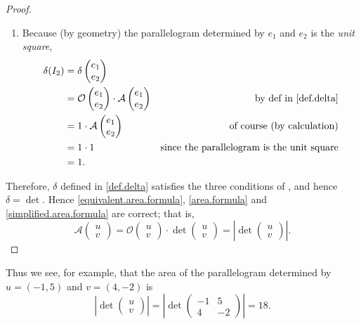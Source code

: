 \begin{proof}
\begin{enumerate}
\item
Because (by geometry) the parallelogram determined by \(e_1\) and \(e_2\) is the \emph{unit square},
\begin{align*}
    \delta(I_2)
    & = \delta \begin{pmatrix} e_1 \\ e_2 \end{pmatrix} \\
    & = \mathcal{O} \begin{pmatrix} e_1 \\ e_2 \end{pmatrix} \cdot \mathcal{A} \begin{pmatrix} e_1 \\ e_2 \end{pmatrix} & \text{by def in \ref{def.delta}} \\
    & = 1 \cdot \mathcal{A} \begin{pmatrix} e_1 \\ e_2 \end{pmatrix} & \text{of course (by calculation)} \\
    & = 1 \cdot 1 & \text{since the parallelogram is the unit square} \\
    & = 1.
\end{align*}
\end{enumerate}

Therefore, \(\delta\) defined in \ref{def.delta} satisfies the three conditions of , and hence \(\delta = \det\).
Hence \ref{equivalent.area.formula}, \ref{area.formula} and \ref{simplified.area.formula} are correct;
that is,
\[
    \mathcal{A}\begin{pmatrix} u \\ v \end{pmatrix}
    = \mathcal{O}\begin{pmatrix} u \\ v \end{pmatrix} \cdot \det \begin{pmatrix} u \\ v \end{pmatrix}
    = \left| \det \begin{pmatrix} u \\ v \end{pmatrix} \right|.
\]
\end{proof}

Thus we see, for example, that the area of the parallelogram determined by \(u = (-1, 5)\) and \(v = (4, -2)\) is
\[
    \left| \det \begin{pmatrix}
        u \\ v
    \end{pmatrix} \right|
    = \left| \det \begin{pmatrix}
        -1 & 5 \\ 4 & -2
    \end{pmatrix} \right|
    = 18.
\]

